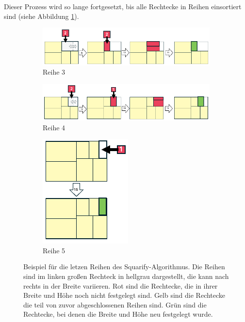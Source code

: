 Dieser Prozess wird so lange fortgesetzt, bis alle Rechtecke in Reihen einsortiert sind (siehe Abbildung \ref{fig:squarify_examples}).

\begin{figure}
    \centering
    \begin{subfigure}{1\textwidth}
        \includegraphics[width=\linewidth]{images/squarify_example_3.png}
        \caption{Reihe 3}
    \end{subfigure}
    \hfill
    \begin{subfigure}{1\textwidth}
        \includegraphics[width=\linewidth]{images/squarify_example_4.png}
        \caption{Reihe 4}
    \end{subfigure}
    \hfill
    \begin{subfigure}{0.4\textwidth}
        \includegraphics[width=0.7\linewidth]{images/squarify_example_5.png}
        \caption{Reihe 5}
    \end{subfigure}
    \caption{Beispiel für die letzen Reihen des Squarify-Algorithmus. Die Reihen sind im linken großen Rechteck in hellgrau dargestellt, die kann nach rechts in der Breite variieren. Rot sind die Rechtecke, die in ihrer Breite und Höhe noch nicht festgelegt sind. Gelb sind die Rechtecke die teil von zuvor abgeschlossenen Reihen sind. Grün sind die Rechtecke, bei denen die Breite und Höhe neu festgelegt wurde.}
    \label{fig:squarify_examples}
\end{figure}

